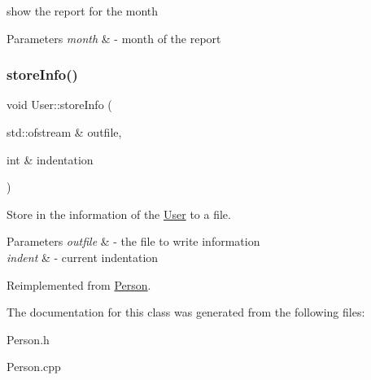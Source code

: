 show the report for the month 


\begin{DoxyParams}{Parameters}
{\em month} & -\/ month of the report \\
\hline
\end{DoxyParams}
\mbox{\label{class_user_aac5ff0f6899f3ce56d1b2d12ed557c79}} 
\subsubsection{\texorpdfstring{store\+Info()}{storeInfo()}}
{\footnotesize\ttfamily void User\+::store\+Info (\begin{DoxyParamCaption}\item[{std\+::ofstream \&}]{outfile,  }\item[{int \&}]{indentation }\end{DoxyParamCaption})\hspace{0.3cm}{\ttfamily [virtual]}}



Store in the information of the \mbox{\hyperlink{class_user}{User}} to a file. 


\begin{DoxyParams}{Parameters}
{\em outfile} & -\/ the file to write information \\
\hline
{\em indent} & -\/ current indentation \\
\hline
\end{DoxyParams}


Reimplemented from \mbox{\hyperlink{class_person_a80f87df3f644706c2ad8fc8b800fdd95}{Person}}.



The documentation for this class was generated from the following files\+:\begin{DoxyCompactItemize}
\item 
Person.\+h\item 
Person.\+cpp\end{DoxyCompactItemize}
